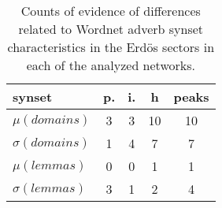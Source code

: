 \begin{table}[h!]
\begin{center}
\begin{tabular}{| l || c | c | c || c |}\hline
{\bf synset} & {\bf p.} & {\bf i.} & {\bf h} & {\bf peaks} \\\hline\hline
$\mu(domains)$ & 3  & 3  & 10  & 10 \\
$\sigma(domains)$ & 1  & 4  & 7  & 7 \\\hline
$\mu(lemmas)$ & 0  & 0  & 1  & 1 \\
$\sigma(lemmas)$ & 3  & 1  & 2  & 4 \\\hline
\end{tabular}
\caption{Counts of evidence of differences related to Wordnet adverb synset characteristics in the Erd\"os sectors in each of the analyzed networks.}
\end{center}
\end{table}